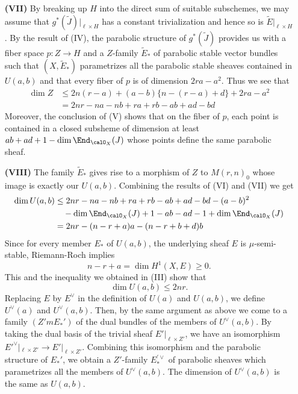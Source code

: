 \begin{itemize}
\item[\bf(VII)] By breaking up $H$ into the direct sum of suitable subschemes, we may assume that $g^{*}(\tilde{J})|_{\ell \times H}$ has a constant trivialization and hence so is $\tilde{E}|_{\ell\times H}$.
By the result of (IV), the parabolic structure of $g^{*}(\tilde{J})$ provides us with a fiber space $p : Z \rightarrow H$ and a $Z$-family $\tilde{E}_{*}$ of parabolic stable vector bundles such that $(X, \tilde{E}_{*})$ parametrizes all the parabolic stable sheaves contained in $U(a, b)$ and that every fiber of $p$ is of dimension $2ra-a^{2}$. Thus we see that
\begin{align*}
\dim Z &\leq 2n(r-a) + (a-b) \{n -(r-a) + d\} + 2ra-a^{2}\\
 &= 2nr-na -nb +ra +rb -ab + ad-bd
\end{align*}
 Moreover, the conclusion of (V) shows that on the fiber of $p$, each point is contained in a closed subsheme of dimension at least $ab + ad + 1-\dim \End_{\calO_{X}}(J)$ whose points define the same parabolic sheaf.

\item[\bf(VIII)] The family $\tilde{E}_{*}$ gives rise to a morphism of $Z$ to $M(r, n)_{0}$ whose image is exactly our $U(a,b)$. Combining the results of (VI) and (VII) we get
\begin{equation*}
\begin{split}
\dim U(a, b) &\leq 2nr -na -nb + ra + rb -ab +ad-bd-(a-b)^{2}\\
             & \quad -\dim \End_{\calO_{X}}(J) + 1 -ab -ad -1 + \dim \End_{\calO_{X}}(J)\\
             &= 2nr -(n-r +a)a-(n-r +b + d)b 
\end{split}
\end{equation*}
Since for every member $E_{*}$ of $U(a, b)$, the underlying sheaf $E$ is $\mu$-semi-stable, Riemann-Roch implies
$$
n-r + a = \dim H^{1}(X, E) \geq 0.
$$
This and the inequality we obtained in (III) show that
$$
\dim U(a, b) \leq 2nr.
$$
Replacing $E$ by $E^{\vee}$ in the definition of $U(a)$ and $U(a, b)$, we  define $U^{\vee}(a)$ and $U^{\vee}(a, b)$. Then, by the same argument as above we come to a family $(Z'm E_{*}')$ of the dual bundles of the members of $U^{\vee}(a, b)$. By taking the dual basis of the trivial sheaf $E'|_{\ell \times Z'}$, we have an isomorphism $E'^{\vee}|_{\ell \times Z'} \rightarrow E'|_{\ell \times Z'}$. Combining this isomorphism and the parabolic structure of $E_{*}'$, we obtain a $Z'$-family $E_{*}^{'\vee}$ of parabolic sheaves which parametrizes all the members of $U^{\vee}(a, b)$. The dimension of $U^{\vee}(a, b)$ is the same as $U(a, b)$.


\end{itemize}
